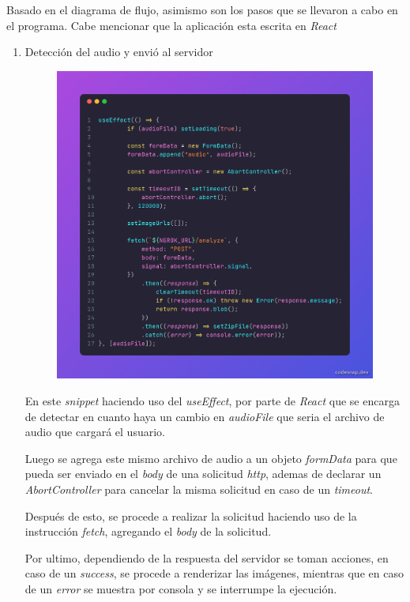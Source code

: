 \documentclass[letterpaper, 12pt]{article}
\begin{document}
Basado en el diagrama de flujo, asimismo son los pasos que
se llevaron a cabo en el programa. Cabe mencionar que la
aplicación esta escrita en \textit{React}

\begin{enumerate}
	\item Detección del audio y envió al servidor
	      \begin{figure}[H]
		      \begin{center}
			      \includegraphics[width=.8\linewidth]{Images/UploadAudioFile.png}
		      \end{center}
	      \end{figure}

	      En este \textit{snippet} haciendo uso del
	      \textit{useEffect}, por parte de \textit{React} que se
	      encarga de detectar en cuanto haya un cambio en
	      \textit{audioFile} que seria el archivo de audio que
	      cargará el usuario.

	      Luego se agrega este mismo archivo de audio a un objeto
	      \textit{formData} para que pueda ser enviado en el
	      \textit{body} de una solicitud \textit{http}, ademas de
	      declarar un \textit{AbortController} para cancelar la misma
	      solicitud en caso de un \textit{timeout}.

	      Después de esto, se procede a realizar la solicitud
	      haciendo uso de la instrucción \textit{fetch}, agregando el
	      \textit{body} de la solicitud.

	      Por ultimo, dependiendo de la respuesta del servidor se
	      toman acciones, en caso de un \textit{success}, se procede
	      a renderizar las imágenes, mientras que en caso de un
	      \textit{error} se muestra por consola y se interrumpe la
	      ejecución.


\end{enumerate}
\end{document}
